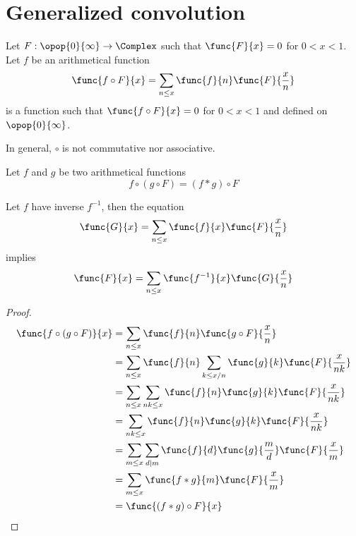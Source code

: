 \section{Generalized convolution}
Let \(F: \opop{0}{\infty} \to \Complex\) such that \(\func{F}{x} = 0\) for \(0 < x < 1\). Let \(f\) be an arithmetical function 
\begin{equation*}
    \func{f \circ F}{x} = \sum_{n \leq x} \func{f}{n} \func{F}{\frac{x}{n}}
\end{equation*}
is a function such that \(\func{f \circ F}{x} = 0\) for \(0 < x < 1\) and defined on \(\opop{0}{\infty}\). 
\begin{remark}
    In general, \(\circ\) is not commutative nor associative.
\end{remark}
\begin{theorem}
    Let \(f\) and \(g\) be two arithmetical functions
    \begin{equation*}
        f \circ (g \circ F) = (f \ast g) \circ F
    \end{equation*}
\end{theorem}
\begin{theorem} 
    Let \(f\) have inverse \(f^{-1}\), then the equation 
    \begin{equation*}
        \func{G}{x} = \sum_{n \leq x} \func{f}{x} \func{F}{\frac{x}{n}}
    \end{equation*}
    implies 
    \begin{equation*}
        \func{F}{x} = \sum_{n \leq x} \func{f^{-1}}{x} \func{G}{\frac{x}{n}}
    \end{equation*}
\end{theorem}

\begin{proof}
    \begin{align*}
        \func{f \circ (g \circ F)}{x} &= \sum_{n \leq x} \func{f}{n} \func{g \circ F}{\frac{x}{n}}\\
        &= \sum_{n \leq x} \func{f}{n} \sum_{k \leq x/n} \func{g}{k} \func{F}{\frac{x}{nk}}\\
        &= \sum_{n \leq x} \sum_{nk \leq x} \func{f}{n}\func{g}{k} \func{F}{\frac{x}{nk}}\\
        &= \sum_{nk \leq x} \func{f}{n}\func{g}{k} \func{F}{\frac{x}{nk}}\\
        &= \sum_{m \leq x} \sum_{d \mid m} \func{f}{d}\func{g}{\frac{m}{d}} \func{F}{\frac{x}{m}}\\
        &= \sum_{m \leq x} \func{f \ast g}{m} \func{F}{\frac{x}{m}}\\
        &= \func{(f \ast g) \circ F}{x}
    \end{align*}
\end{proof}

